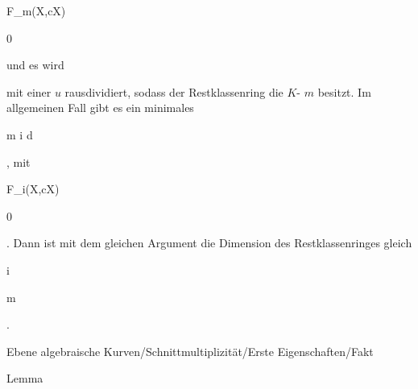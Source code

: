 {{\vergleichskette

{ F_m(X,cX)
}

{ \neq }{ 0
}

{  }{
}

{    }{
}

{   }{
}

}
{}{}{}
und es wird

 mit einer
$u$ rausdividiert, sodass der Restklassenring die
$K$-
$m$ besitzt. Im allgemeinen Fall gibt es ein minimales


 {}

 {m \leq i \leq d} {}

 {} {} {} {,} mit


\mavergleichskette

{\vergleichskette

{ F_i(X,cX)
}

{ \neq }{ 0
}

{  }{
}

{    }{
}

{   }{
}

}
{}{}{}
 {} {.}
Dann ist mit dem gleichen Argument die Dimension des Restklassenringes gleich


\mavergleichskette

{\vergleichskette

{ i
}

{ \geq }{ m
}

{  }{
}

{    }{
}

{   }{
}

}
{}{}{.}


}



{Ebene algebraische Kurven/Schnittmultiplizität/Erste Eigenschaften/Fakt}

{Lemma}

{}

